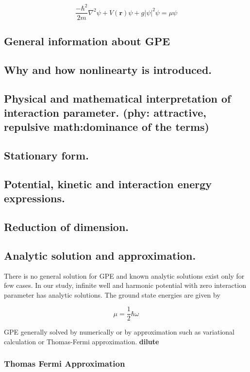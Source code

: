 \documentclass[a4paper,times,hidelinks,12pt]{article}
\begin{document}
\begin{equation}
\label{eq:GPE_time_indep}
\frac{-\hbar^2}{2m}\nabla^2\psi + V(\boldsymbol{r})\psi + g|\psi|^2\psi = \mu\psi
\end{equation}


 
\subsection{General information about GPE}
\subsection{Why and how nonlinearty is introduced.}
\subsection{Physical and mathematical interpretation of interaction parameter. (phy: attractive, repulsive  math:dominance of the terms)}
\subsection{Stationary form.}
\subsection{Potential, kinetic and interaction energy expressions.}
\subsection{Reduction of dimension.}
\subsection{Analytic solution and approximation.}

There is no general solution for GPE and known analytic solutions exist only for few cases. In our study, infinite well and harmonic potential with zero interaction parameter has analytic solutions. The ground state energies are given by

\begin{equation}
\label{eq:GPE_1D_solution_harmonic}
    \mu = \frac{1}{2}\hbar\omega
\end{equation}


GPE generally solved by numerically or by approximation such as variational calculation or Thomas-Fermi approximation. \textbf{dilute}

\subsubsection{Thomas Fermi Approximation}
\end{document}
